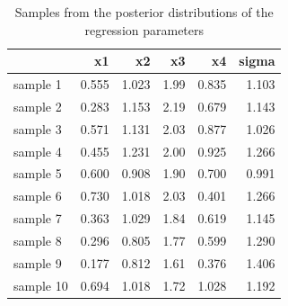 \documentclass[11pt,a4paper,twoside]{book}
\newenvironment{knitrout}{}{} %
\begin{document}
\begin{knitrout}
\color{fgcolor}\begin{table}

\caption{\label{tab:simdata.postsample2}Samples from the posterior distributions of the regression parameters}
\centering
\begin{tabular}[t]{lrrrrr}
\toprule
  & x1 & x2 & x3 & x4 & sigma\\
\midrule
sample 1 & 0.555 & 1.023 & 1.99 & 0.835 & 1.103\\
sample 2 & 0.283 & 1.153 & 2.19 & 0.679 & 1.143\\
sample 3 & 0.571 & 1.131 & 2.03 & 0.877 & 1.026\\
sample 4 & 0.455 & 1.231 & 2.00 & 0.925 & 1.266\\
sample 5 & 0.600 & 0.908 & 1.90 & 0.700 & 0.991\\
sample 6 & 0.730 & 1.018 & 2.03 & 0.401 & 1.266\\
sample 7 & 0.363 & 1.029 & 1.84 & 0.619 & 1.145\\
sample 8 & 0.296 & 0.805 & 1.77 & 0.599 & 1.290\\
sample 9 & 0.177 & 0.812 & 1.61 & 0.376 & 1.406\\
sample 10 & 0.694 & 1.018 & 1.72 & 1.028 & 1.192\\
\bottomrule
\end{tabular}
\end{table}


\end{knitrout}
\end{document}
